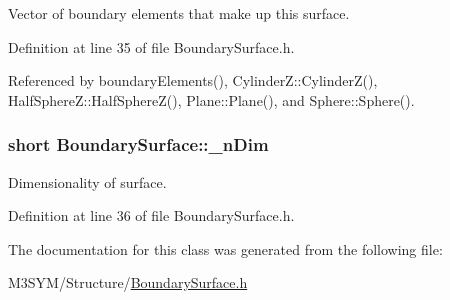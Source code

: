 Vector of boundary elements that make up this surface. 



Definition at line 35 of file Boundary\+Surface.\+h.



Referenced by boundary\+Elements(), Cylinder\+Z\+::\+Cylinder\+Z(), Half\+Sphere\+Z\+::\+Half\+Sphere\+Z(), Plane\+::\+Plane(), and Sphere\+::\+Sphere().

\hypertarget{classBoundarySurface_af3ed79310c6ba6cdc8e9f176bf463eb1}{
\subsubsection[{\+\_\+n\+Dim}]{\setlength{\rightskip}{0pt plus 5cm}short Boundary\+Surface\+::\+\_\+n\+Dim\hspace{0.3cm}{\ttfamily [protected]}}}\label{classBoundarySurface_af3ed79310c6ba6cdc8e9f176bf463eb1}


Dimensionality of surface. 



Definition at line 36 of file Boundary\+Surface.\+h.



The documentation for this class was generated from the following file\+:\begin{DoxyCompactItemize}
\item 
M3\+S\+Y\+M/\+Structure/\hyperlink{BoundarySurface_8h}{Boundary\+Surface.\+h}\end{DoxyCompactItemize}
